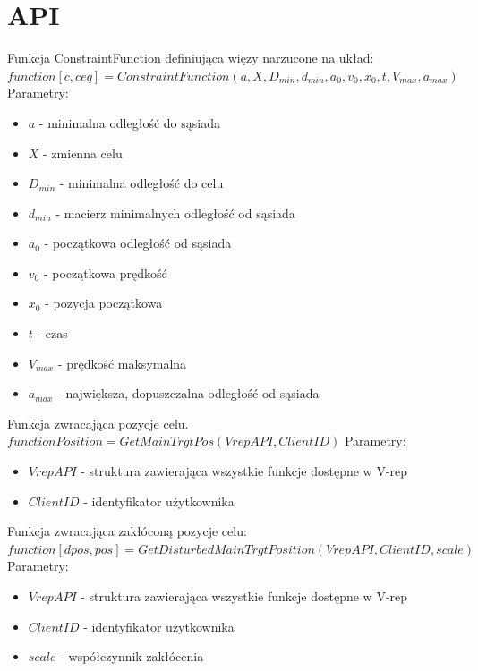 \documentclass[a4paper, 11pt, oneside]{article}
\begin{document}
\section{API}
Funkcja ConstraintFunction definiująca więzy narzucone na układ:
\newline
 $function [c,ceq]=ConstraintFunction(a,X,D_{min},d_{min},a_{0},v_{0},x_{0},t,V_{max},a_{max})$\newline
Parametry:
\begin{itemize}
\item $a$ -  minimalna odległość do sąsiada
\item $X$ - zmienna celu
\item $D_{min}$ -  minimalna odległość do celu
\item $d_{min}$ -  macierz minimalnych odległość od sąsiada
\item $a_{0}$ - początkowa odległość od sąsiada
\item $v_{0}$  - początkowa prędkość
\item $x_{0}$ - pozycja początkowa
\item $t$ - czas
\item $V_{max}$ - prędkość maksymalna
\item $a_{max}$ - największa, dopuszczalna odległość od sąsiada
\end{itemize}

Funkcja zwracająca pozycje celu.
\newline
$function Position = GetMainTrgtPos(VrepAPI, ClientID)$
\newline
Parametry:
\begin{itemize}
\item $VrepAPI$ - struktura zawierająca wszystkie funkcje dostępne w V-rep
\item $ClientID$ - identyfikator użytkownika
\end{itemize}

Funkcja zwracająca zakłóconą pozycje celu: 
\newline
$function [dpos, pos]=GetDisturbedMainTrgtPosition(VrepAPI, ClientID, scale)$
\newline
Parametry:
\begin{itemize}
\item $VrepAPI$ - struktura zawierająca wszystkie funkcje dostępne w V-rep
\item $ClientID$ - identyfikator użytkownika
\item $scale$ - współczynnik zakłócenia
\end{itemize}
\end{document}
